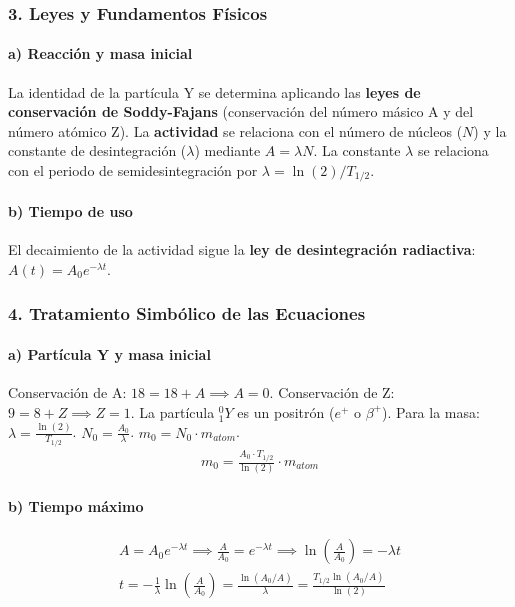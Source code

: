 \subsubsection*{3. Leyes y Fundamentos Físicos}
\paragraph{a) Reacción y masa inicial}
La identidad de la partícula Y se determina aplicando las \textbf{leyes de conservación de Soddy-Fajans} (conservación del número másico A y del número atómico Z).
La \textbf{actividad} se relaciona con el número de núcleos ($N$) y la constante de desintegración ($\lambda$) mediante $A = \lambda N$. La constante $\lambda$ se relaciona con el periodo de semidesintegración por $\lambda = \ln(2)/T_{1/2}$.

\paragraph{b) Tiempo de uso}
El decaimiento de la actividad sigue la \textbf{ley de desintegración radiactiva}: $A(t) = A_0 e^{-\lambda t}$.

\subsubsection*{4. Tratamiento Simbólico de las Ecuaciones}
\paragraph{a) Partícula Y y masa inicial}
Conservación de A: $18 = 18 + A \implies A=0$.
Conservación de Z: $9 = 8 + Z \implies Z=1$.
La partícula ${}_{1}^{0}Y$ es un positrón ($e^+$ o $\beta^+$).
Para la masa: $\lambda = \frac{\ln(2)}{T_{1/2}}$. $N_0 = \frac{A_0}{\lambda}$. $m_0 = N_0 \cdot m_{atom}$.
\begin{gather}
    m_0 = \frac{A_0 \cdot T_{1/2}}{\ln(2)} \cdot m_{atom}
\end{gather}
\paragraph{b) Tiempo máximo}
\begin{gather}
    A = A_0 e^{-\lambda t} \implies \frac{A}{A_0} = e^{-\lambda t} \implies \ln\left(\frac{A}{A_0}\right) = -\lambda t \nonumber \\
    t = -\frac{1}{\lambda}\ln\left(\frac{A}{A_0}\right) = \frac{\ln(A_0/A)}{\lambda} = \frac{T_{1/2}\ln(A_0/A)}{\ln(2)}
\end{gather}

